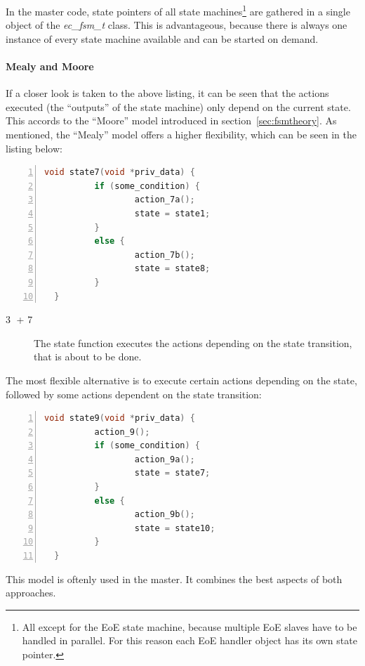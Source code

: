 \documentclass[a4paper,12pt,BCOR6mm,bibtotoc,idxtotoc]{scrbook}
\newcommand{\linenum}[1]{\normalfont\textcircled{\tiny #1}}
\begin{document}
In the master code, state pointers of all state machines\footnote{All except
for the EoE state machine, because multiple EoE slaves have to be handled in
parallel. For this reason each EoE handler object has its own state pointer.}
are gathered in a single object of the \textit{ec\_fsm\_t} class. This is
advantageous, because there is always one instance of every state machine
available and can be started on demand.

\paragraph{Mealy and Moore}

If a closer look is taken to the above listing, it can be seen that
the actions executed (the ``outputs'' of the state machine) only
depend on the current state. This accords to the ``Moore'' model
introduced in section~\ref{sec:fsmtheory}. As mentioned, the ``Mealy''
model offers a higher flexibility, which can be seen in the listing
below:

\begin{lstlisting}[gobble=2,language=C,numbers=left]
  void state7(void *priv_data) {
          if (some_condition) {
                  action_7a();
                  state = state1;
          }
          else {
                  action_7b();
                  state = state8;
          }
  }
\end{lstlisting}

\begin{description}
\item[\linenum{3} + \linenum{7}] The
  state function executes the actions depending on the state
  transition, that is about to be done.
\end{description}

The most flexible alternative is to execute certain actions depending
on the state, followed by some actions dependent on the state
transition:

\begin{lstlisting}[gobble=2,language=C,numbers=left]
  void state9(void *priv_data) {
          action_9();
          if (some_condition) {
                  action_9a();
                  state = state7;
          }
          else {
                  action_9b();
                  state = state10;
          }
  }
\end{lstlisting}

This model is oftenly used in the master. It combines the best aspects
of both approaches.
\end{document}
